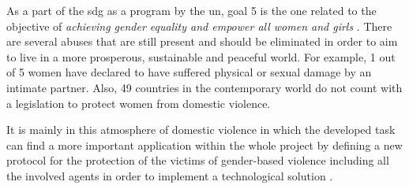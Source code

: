 	As a part of the \acrfull{sdg} as a program by the \acrfull{un}, goal 5 is the one related to the objective of \textit{achieving gender equality and empower all women and girls} \cite{UnitedNations}. There are several abuses that are still present and should be eliminated in order to aim to live in a more prosperous, sustainable and peaceful world. For example, 1 out of 5 women have declared to have suffered physical or sexual damage by an intimate partner. Also, 49 countries in the contemporary world do not count with a legislation to protect women from domestic violence. 
	
	It is mainly in this atmosphere of domestic violence in which the developed task can find a more important application within the whole project by defining a new protocol for the protection of the victims of gender-based violence including all the involved agents in order to implement a technological solution \cite{UC3M4SafetyTeam2018}.
	
	
	
	
	